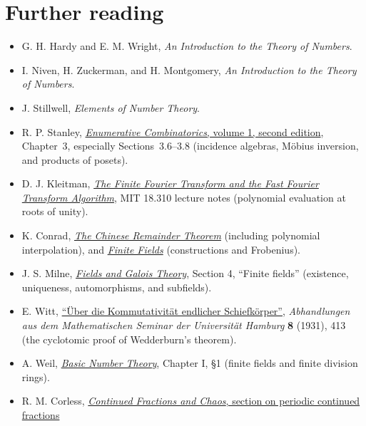 \documentclass[11pt,oneside]{book}
\theoremstyle{course}
\theoremstyle{definition}
\begin{document}
\chapter*{Further reading}
\begin{itemize}[parsep=0pt,itemsep=2pt,topsep=4pt]
  \item G. H. Hardy and E. M. Wright, \emph{An Introduction to the Theory of Numbers}.
  \item I. Niven, H. Zuckerman, and H. Montgomery, \emph{An Introduction to the Theory of Numbers}.
  \item J. Stillwell, \emph{Elements of Number Theory}.
  \item R. P. Stanley,
  \href{https://math.mit.edu/~rstan/ec/ec1.pdf}{\emph{Enumerative Combinatorics}, volume 1, second edition},
  Chapter~3, especially Sections~3.6--3.8 (incidence algebras, M\"obius
  inversion, and products of posets).
  \item D. J. Kleitman,
  \href{https://math.mit.edu/~djk/18.310/Lecture-Notes/23_finite_fourier.html}{\emph{The Finite Fourier Transform and the Fast Fourier Transform Algorithm}},
  MIT 18.310 lecture notes (polynomial evaluation at roots of unity).
  \item K. Conrad,
  \href{https://kconrad.math.uconn.edu/blurbs/ugradnumthy/crt.pdf}{\emph{The Chinese Remainder Theorem}}
  (including polynomial interpolation), and
  \href{https://kconrad.math.uconn.edu/blurbs/galoistheory/finitefields.pdf}{\emph{Finite Fields}}
  (constructions and Frobenius).
  \item J. S. Milne,
  \href{https://www.jmilne.org/math/CourseNotes/FT.pdf}{\emph{Fields and Galois Theory}},
  Section 4, ``Finite fields'' (existence, uniqueness, automorphisms, and subfields).
  \item E. Witt,
  \href{https://nonagon.org/ExLibris/sites/default/files/pdf/Uber-Kommutativitat-endlicher-Schiefkorper-Ernst-Witt.pdf}{``\"Uber die Kommutativit\"at endlicher Schiefk\"orper''},
  \emph{Abhandlungen aus dem Mathematischen Seminar der Universit\"at Hamburg}
  \textbf{8} (1931), 413 (the cyclotomic proof of Wedderburn's theorem).
  \item A. Weil,
  \href{https://link.springer.com/book/10.1007/978-3-642-61945-8}{\emph{Basic Number Theory}},
  Chapter I, \S1 (finite fields and finite division rings).
  \item R. M. Corless,
  \href{https://www.cecm.sfu.ca/organics/papers/corless/confrac/html/node6-an.shtml}{\emph{Continued Fractions and Chaos}, section on periodic continued fractions}

\end{itemize}
\end{document}
